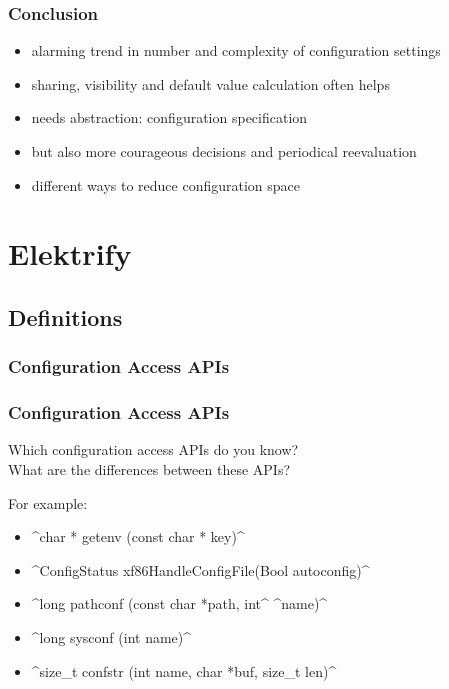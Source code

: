 \begin{frame}
	\frametitle{Conclusion}
	\begin{itemize}
	\item alarming trend in number and complexity of configuration settings
	\item sharing, visibility and default value calculation often helps
	\item needs abstraction: configuration specification
	\item but also more courageous decisions and periodical reevaluation
	\item different ways to reduce configuration space
	\end{itemize}
\end{frame}




\section{Elektrify}



\subsection{Definitions}

\begin{frame}
	\frametitle{Configuration Access APIs}

	\Large

\end{frame}

\begin{frame}[fragile]
	\frametitle{Configuration Access APIs}

	\begin{task}
	Which configuration access APIs do you know? \\
	What are the differences between these APIs?
	\end{task}

	For example:
	\begin{itemize}[<+-| alert@+>]
	\item ^char * getenv (const char * key)^
	\item ^ConfigStatus xf86HandleConfigFile(Bool autoconfig)^
	\item ^long pathconf (const char *path, int^ ^name)^
	\item ^long sysconf (int name)^
	\item ^size_t confstr (int name, char *buf, size_t len)^
	\end{itemize}
\end{frame}

